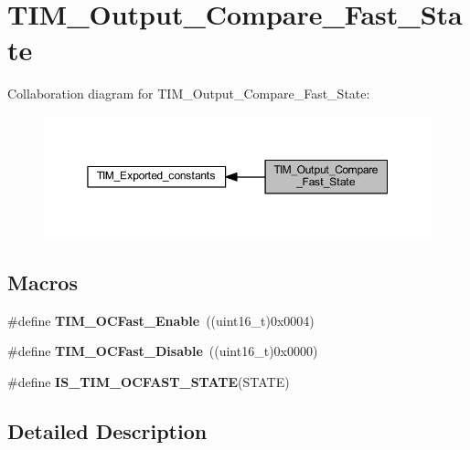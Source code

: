 \hypertarget{group___t_i_m___output___compare___fast___state}{}\section{T\+I\+M\+\_\+\+Output\+\_\+\+Compare\+\_\+\+Fast\+\_\+\+State}
\label{group___t_i_m___output___compare___fast___state}
Collaboration diagram for T\+I\+M\+\_\+\+Output\+\_\+\+Compare\+\_\+\+Fast\+\_\+\+State\+:
\nopagebreak
\begin{figure}[H]
\begin{center}
\leavevmode
\includegraphics[width=350pt]{group___t_i_m___output___compare___fast___state}
\end{center}
\end{figure}
\subsection*{Macros}
\begin{DoxyCompactItemize}
\item 
\mbox{\label{group___t_i_m___output___compare___fast___state_ga0cfb598c985363ee7004e52c97c524a3}} 
\#define {\bfseries T\+I\+M\+\_\+\+O\+C\+Fast\+\_\+\+Enable}~((uint16\+\_\+t)0x0004)
\item 
\mbox{\label{group___t_i_m___output___compare___fast___state_gab3d39f8797953cb58754205169d8278e}} 
\#define {\bfseries T\+I\+M\+\_\+\+O\+C\+Fast\+\_\+\+Disable}~((uint16\+\_\+t)0x0000)
\item 
\#define {\bfseries I\+S\+\_\+\+T\+I\+M\+\_\+\+O\+C\+F\+A\+S\+T\+\_\+\+S\+T\+A\+TE}(S\+T\+A\+TE)
\end{DoxyCompactItemize}


\subsection{Detailed Description}



